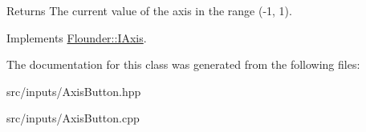 \begin{DoxyReturn}{Returns}
The current value of the axis in the range (-\/1, 1). 
\end{DoxyReturn}


Implements \hyperlink{class_flounder_1_1_i_axis_a5107db92879be3e2ea56841baea993b3}{Flounder\+::\+I\+Axis}.



The documentation for this class was generated from the following files\+:\begin{DoxyCompactItemize}
\item 
src/inputs/Axis\+Button.\+hpp\item 
src/inputs/Axis\+Button.\+cpp\end{DoxyCompactItemize}
